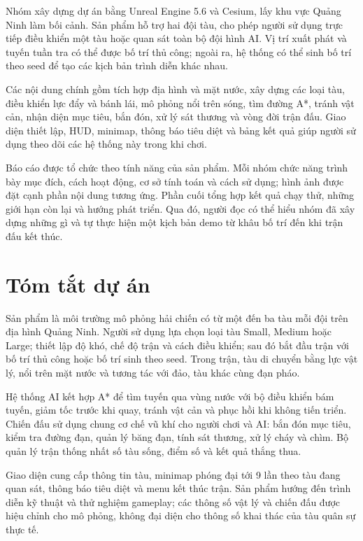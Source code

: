 \documentclass[11pt,a4paper,oneside]{report}
\begin{document}
Nhóm xây dựng dự án bằng Unreal Engine 5.6 và Cesium, lấy khu vực Quảng Ninh làm bối cảnh. Sản phẩm hỗ trợ hai đội tàu, cho phép người sử dụng trực tiếp điều khiển một tàu hoặc quan sát toàn bộ đội hình AI. Vị trí xuất phát và tuyến tuần tra có thể được bố trí thủ công; ngoài ra, hệ thống có thể sinh bố trí theo seed để tạo các kịch bản trình diễn khác nhau.

Các nội dung chính gồm tích hợp địa hình và mặt nước, xây dựng các loại tàu, điều khiển lực đẩy và bánh lái, mô phỏng nổi trên sóng, tìm đường A*, tránh vật cản, nhận diện mục tiêu, bắn đón, xử lý sát thương và vòng đời trận đấu. Giao diện thiết lập, HUD, minimap, thông báo tiêu diệt và bảng kết quả giúp người sử dụng theo dõi các hệ thống này trong khi chơi.

Báo cáo được tổ chức theo tính năng của sản phẩm. Mỗi nhóm chức năng trình bày mục đích, cách hoạt động, cơ sở tính toán và cách sử dụng; hình ảnh được đặt cạnh phần nội dung tương ứng. Phần cuối tổng hợp kết quả chạy thử, những giới hạn còn lại và hướng phát triển. Qua đó, người đọc có thể hiểu nhóm đã xây dựng những gì và tự thực hiện một kịch bản demo từ khâu bố trí đến khi trận đấu kết thúc.
\clearpage
{}
\chapter*{Tóm tắt dự án}
Sản phẩm là môi trường mô phỏng hải chiến có từ một đến ba tàu mỗi đội trên địa hình Quảng Ninh. Người sử dụng lựa chọn loại tàu Small, Medium hoặc Large; thiết lập độ khó, chế độ trận và cách điều khiển; sau đó bắt đầu trận với bố trí thủ công hoặc bố trí sinh theo seed. Trong trận, tàu di chuyển bằng lực vật lý, nổi trên mặt nước và tương tác với đảo, tàu khác cùng đạn pháo.

Hệ thống AI kết hợp A* để tìm tuyến qua vùng nước với bộ điều khiển bám tuyến, giảm tốc trước khi quay, tránh vật cản và phục hồi khi không tiến triển. Chiến đấu sử dụng chung cơ chế vũ khí cho người chơi và AI: bắn đón mục tiêu, kiểm tra đường đạn, quản lý băng đạn, tính sát thương, xử lý cháy và chìm. Bộ quản lý trận thống nhất số tàu sống, điểm số và kết quả thắng thua.

Giao diện cung cấp thông tin tàu, minimap phóng đại tới 9 lần theo tàu đang quan sát, thông báo tiêu diệt và menu kết thúc trận. Sản phẩm hướng đến trình diễn kỹ thuật và thử nghiệm gameplay; các thông số vật lý và chiến đấu được hiệu chỉnh cho mô phỏng, không đại diện cho thông số khai thác của tàu quân sự thực tế.
\end{document}
